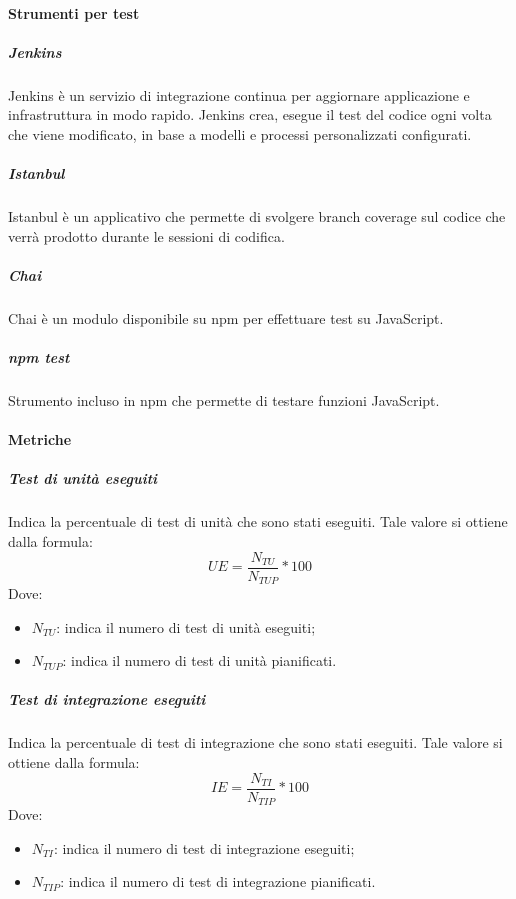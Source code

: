 \documentclass[../NormeDiProgetto_v4.0.0.tex]{subfiles}
\begin{document}
		\paragraph{Strumenti per test}
            \subparagraph{Jenkins}
            Jenkins è un servizio di integrazione continua per aggiornare applicazione e infrastruttura in modo rapido. Jenkins crea, esegue il test del codice ogni volta che viene modificato, in base a modelli e processi personalizzati configurati.
            
            \subparagraph{Istanbul}
            Istanbul è un applicativo che permette di svolgere branch coverage sul codice che verrà prodotto durante le sessioni di codifica.
            
			\subparagraph{Chai}
			Chai è un modulo disponibile su npm per effettuare test su JavaScript.

			\subparagraph{npm test}
			Strumento incluso in npm che permette di testare funzioni JavaScript.

		\paragraph{Metriche}\mbox{}
			\subparagraph{Test di unità eseguiti}
			Indica la percentuale di test di unità che sono stati eseguiti.
			Tale valore si ottiene dalla formula:
			\begin{equation*}
				UE = \frac{N_{TU}}{N_{TUP}} * 100
			\end{equation*}
			Dove:
			\begin{itemize}
				\item \textbf{$N_{TU}$}: indica il numero di test di unità eseguiti;
				\item \textbf{$N_{TUP}$}: indica il numero di test di unità pianificati.
			\end{itemize}
			
			\subparagraph{Test di integrazione eseguiti}
			Indica la percentuale di test di integrazione che sono stati eseguiti.
			Tale valore si ottiene dalla formula:
			\begin{equation*}
				IE = \frac{N_{TI}}{N_{TIP}} * 100
			\end{equation*}
			Dove:
			\begin{itemize}
				\item \textbf{$N_{TI}$}: indica il numero di test di integrazione eseguiti;
				\item \textbf{$N_{TIP}$}: indica il numero di test di integrazione pianificati.
			\end{itemize}
			
\end{document}
